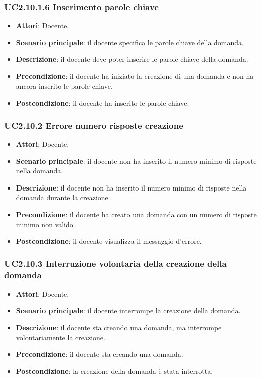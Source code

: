 \subsubsection{UC2.10.1.6 Inserimento parole chiave}
\begin{itemize}
\item \textbf{Attori}: Docente.
\item \textbf{Scenario principale}: il docente specifica le parole chiave della domanda.
\item \textbf{Descrizione}: il docente deve poter inserire le parole chiave della domanda.
\item \textbf{Precondizione}: il docente ha iniziato la creazione di una domanda e non ha ancora inserito le parole chiave.
\item \textbf{Postcondizione}: il docente ha inserito le parole chiave.
\end{itemize}
\subsubsection{UC2.10.2 Errore numero risposte creazione}
\begin{itemize}
\item \textbf{Attori}: Docente.
\item \textbf{Scenario principale}: il docente non ha inserito il numero minimo di risposte nella domanda.
\item \textbf{Descrizione}: il docente non ha inserito il numero minimo di risposte nella domanda durante la creazione.
\item \textbf{Precondizione}: il docente ha creato una domanda con un numero di risposte minimo non valido.
\item \textbf{Postcondizione}: il docente visualizza il messaggio d'errore.
\end{itemize}
\subsubsection{UC2.10.3 Interruzione volontaria della creazione della domanda}
\begin{itemize}
\item \textbf{Attori}: Docente.
\item \textbf{Scenario principale}: il docente interrompe la creazione della domanda.
\item \textbf{Descrizione}: il docente sta creando una domanda, ma interrompe volontariamente la creazione.
\item \textbf{Precondizione}: il docente sta creando una domanda.
\item \textbf{Postcondizione}: la creazione della domanda è stata interrotta.
\end{itemize}
